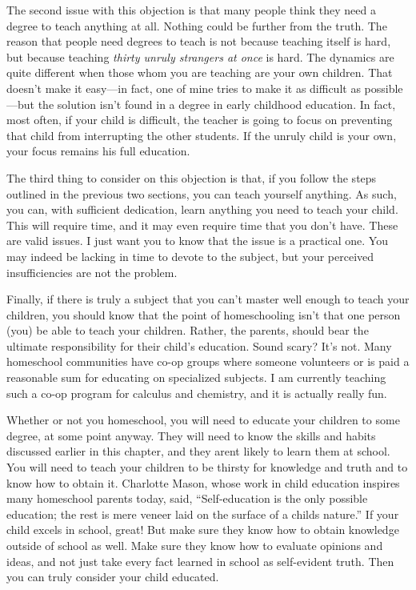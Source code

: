 The second issue with this objection is that many people think they need
a degree to teach anything at all. Nothing could be further from the
truth. The reason that people need degrees to teach is not because
teaching itself is hard, but because teaching \textit{thirty unruly
strangers at once} is hard. The dynamics are quite different when
those whom you are
teaching are your own children. That doesn’t make it easy—in fact, one
of mine tries to make it as difficult as possible—but the solution
isn’t found in a degree in early childhood education. In fact, most
often, if your child is difficult, the teacher is going to focus on
preventing that child from interrupting the other students. If the
unruly child is your own, your focus remains his full education.

The third thing to consider on this objection is that, if you follow the
steps outlined in the previous two sections, you can teach yourself
anything. As such, you can, with sufficient dedication, learn anything
you need to teach your child. This will require time, and it may even
require time that you don’t have. These are valid issues. I just want
you to know that the issue is a practical one. 
You may indeed be
lacking in time to devote to the subject, but your perceived
insufficiencies are not the problem. 

Finally, if there is truly a subject that you can’t master well enough
to teach your children, you should know that the point of homeschooling
isn’t that one person (you) be able to teach your children.
Rather, the parents,
should bear the ultimate responsibility for their child’s education.
Sound scary? It’s not.
Many homeschool communities have co-op groups where someone volunteers
or is paid a reasonable sum for educating on specialized subjects. I am
currently teaching such a co-op program for calculus and chemistry, and
it is actually really fun.

Whether or not you homeschool, you will need to educate your children
to some degree, at
some point anyway.  They will need to know the skills and habits
discussed earlier in this chapter, and they aren{\textquotesingle}t
likely to learn them at school. You will need to teach your children to
be thirsty for knowledge and truth and to know how to obtain it.
Charlotte Mason, whose work in child education inspires many homeschool
parents today, said, “Self-education is the only possible education;
the rest is mere veneer laid on the surface of a
child{\textquotesingle}s nature.”  If
your child excels in
school, great!  But make sure they know how to obtain knowledge outside
of school as
well. Make sure they
know how to evaluate opinions and ideas, and not just take every fact
learned in school as self-evident truth. Then you can truly consider
your child educated.


